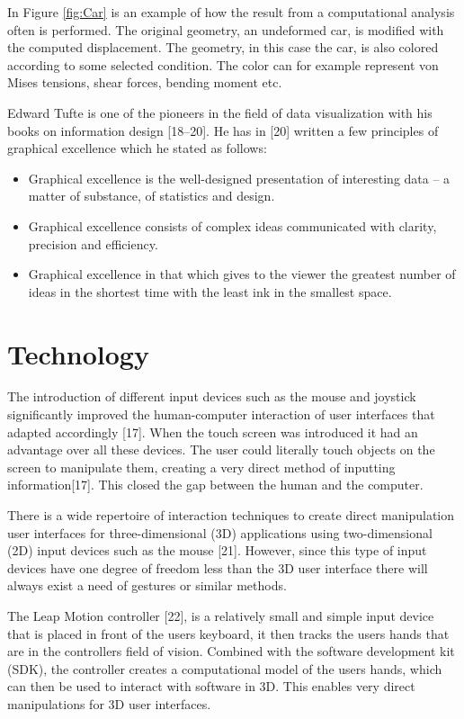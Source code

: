 In Figure \ref{fig:Car} is an example of how the result from a computational analysis often is performed. The original geometry, an undeformed car, is modified with the computed displacement. The geometry, in this case the car, is also colored according to some selected condition. The color can for example represent von Mises tensions, shear forces, bending moment etc. 

Edward Tufte is one of the pioneers in the field of data visualization with his books on information design [18–20]. He has in [20] written a few principles of graphical excellence which he stated as follows:

\begin{itemize} 
\item Graphical excellence is the well-designed presentation of interesting data – a matter of substance, of statistics and design.
\item Graphical excellence consists of complex ideas communicated with clarity, precision and efficiency.
\item Graphical excellence in that which gives to the viewer the greatest number of ideas in the shortest time with the least ink in the smallest space.
\end{itemize} 

\section{Technology}
The introduction of different input devices such as the mouse and joystick significantly improved the human-computer interaction of user interfaces that adapted accordingly [17]. When the touch screen was introduced it had an advantage over all these devices. The user could literally touch objects on the screen to manipulate them, creating a very direct method of inputting information[17]. This closed the gap between the human and the computer.

There is a wide repertoire of interaction techniques to create direct manipulation user interfaces for three-dimensional (3D) applications using two-dimensional (2D) input devices such as the mouse [21]. However, since this type of input devices have one degree of freedom less than the 3D user interface there will always exist a need of gestures or similar methods. 

The Leap Motion controller [22], is a relatively small and simple input device that is placed in front of the users keyboard, it then tracks the users hands that are in the controllers field of vision. Combined with the software development kit (SDK), the controller creates a computational model of the users hands, which can then be used to interact with software in 3D. This enables very direct manipulations for 3D user interfaces.

